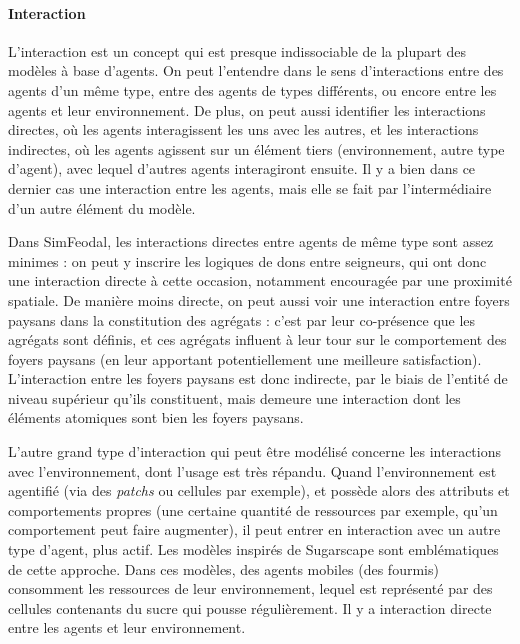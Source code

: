 \paragraph{Interaction} L'interaction est un concept qui est presque indissociable de la plupart des modèles à base d'agents.
On peut l'entendre dans le sens d'interactions entre des agents d'un même type, entre des agents de types différents, ou encore entre les agents et leur environnement.
De plus, on peut aussi identifier les interactions directes, où les agents interagissent les uns avec les autres, et les interactions indirectes, où les agents agissent sur un élément tiers (environnement, autre type d'agent), avec lequel d'autres agents interagiront ensuite.
Il y a bien dans ce dernier cas une interaction entre les agents, mais elle se fait par l'intermédiaire d'un autre élément du modèle.

Dans SimFeodal, les interactions directes entre agents de même type sont assez minimes : on peut y inscrire les logiques de dons entre seigneurs, qui ont donc une interaction directe à cette occasion, notamment encouragée par une proximité spatiale.
De manière moins directe, on peut aussi voir une interaction entre foyers paysans dans la constitution des agrégats : c'est par leur co-présence que les agrégats sont définis, et ces agrégats influent à leur tour sur le comportement des foyers paysans (en leur apportant potentiellement une meilleure satisfaction).
L'interaction entre les foyers paysans est donc indirecte, par le biais de l'entité de niveau supérieur qu'ils constituent, mais demeure une interaction dont les éléments atomiques sont bien les foyers paysans.

L'autre grand type d'interaction qui peut être modélisé concerne les interactions avec l'environnement, dont l'usage est très répandu.
Quand l'environnement est agentifié (via des \textit{patchs} ou cellules par exemple), et possède alors des attributs et comportements propres (une certaine quantité de ressources par exemple, qu'un comportement peut faire augmenter), il peut entrer en interaction avec un autre type d'agent, plus \og actif\fg{}.
Les modèles inspirés de \mbox{\og Sugarscape\fg{}} \autocite{epstein_growing_1996} sont emblématiques de cette approche.
Dans ces modèles, des agents mobiles (des fourmis) \og consomment\fg{} les ressources de leur environnement, lequel est représenté par des cellules contenants du \og sucre\fg{} qui \og pousse\fg{} régulièrement.
Il y a interaction directe entre les agents et leur environnement.

